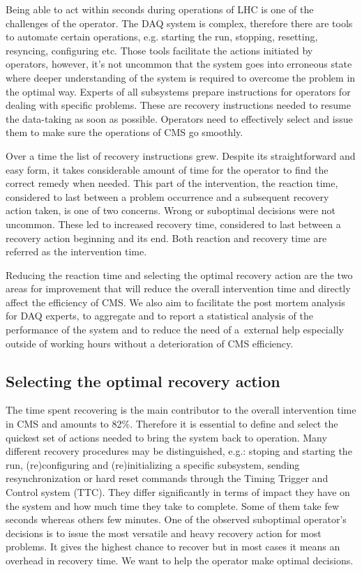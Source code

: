 \documentclass[a4paper]{jpconf}
\begin{document}
Being able to act within seconds during operations of LHC is one of the challenges of the operator. The DAQ system is complex, therefore there are tools to automate certain operations, e.g. starting the run, stopping, resetting, resyncing, configuring etc. Those tools facilitate the actions initiated by operators, however, it's not uncommon that the system goes into erroneous state where deeper understanding of the system is required to overcome the problem in the optimal way. Experts of all subsystems prepare instructions for operators for dealing with specific problems. These are recovery instructions needed to resume the data-taking as soon as possible. Operators need to effectively select and issue them to make sure the operations of CMS go smoothly.

Over a time the list of recovery instructions grew. Despite its straightforward and easy form, it takes considerable amount of time for the operator to find the correct remedy when needed. This part of the intervention, the reaction time, considered to last between a problem occurrence and a subsequent recovery action taken, is one of two concerns. Wrong or suboptimal decisions were not uncommon. These led to increased recovery time, considered to last between a recovery action beginning and its end. Both reaction and recovery time are referred as the intervention time.

Reducing the reaction time and selecting the optimal recovery action are the two areas for improvement that will reduce the overall intervention time and directly affect the efficiency of CMS. We also aim to facilitate the post mortem analysis for DAQ experts, to aggregate and to report a statistical analysis of the performance of the system and to reduce the need of a~external help especially outside of working hours without a deterioration of CMS efficiency. 

\subsection{Selecting the optimal recovery action}
The time spent recovering is the main contributor to the overall intervention time in CMS and amounts to 82\%. Therefore it is essential to define and select the quickest set of actions needed to bring the system back to operation. Many different recovery procedures may be distinguished, e.g.: stoping and starting the run, (re)configuring and (re)initializing a specific subsystem, sending resynchronization or hard reset commands through the Timing Trigger and Control system (TTC). They differ significantly in terms of impact they have on the system and how much time they take to complete. Some of them take few seconds whereas others few minutes. One of the observed suboptimal operator's decisions is to issue the most versatile and heavy recovery action for most problems. It gives the highest chance to recover but in most cases it means an overhead in recovery time. We want to help the operator make optimal decisions.
\end{document}
